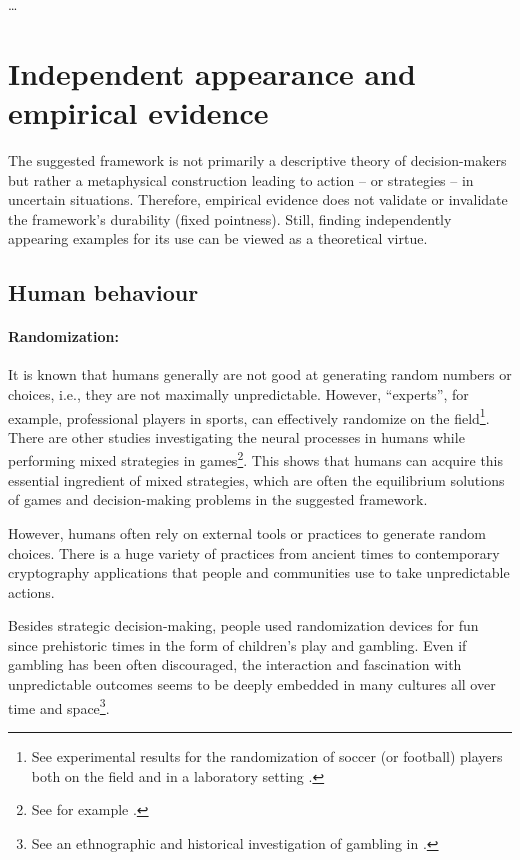\documentclass{article}
\begin{document}
\dots



\section*{Independent appearance and empirical evidence}

The suggested framework is not primarily a descriptive theory of decision-makers but rather a metaphysical construction leading to action -- or strategies -- in uncertain situations.
Therefore, empirical evidence does not validate or invalidate the framework's durability (fixed pointness). Still, finding independently appearing examples for its use can be viewed as a theoretical virtue.

\subsection*{Human behaviour}

\paragraph{Randomization:}
It is known that humans generally are not good at generating random numbers or choices, i.e., they are not maximally unpredictable. However, ``experts'', for example, professional players in sports, can effectively randomize on the field\footnote{See experimental results for the randomization of soccer (or football) players both on the field and in a laboratory setting \cite{paper:MinimaxExperiment01,paper:MinimaxExperiment02,paper:MinimaxExperiment03}.}. There are other studies investigating the neural processes in humans while performing mixed strategies in games\footnote{See for example \cite{paper:PrimateRandomArticle}.}.
This shows that humans can acquire this essential ingredient of mixed strategies, which are often the equilibrium solutions of games and decision-making problems in the suggested framework.

However, humans often rely on external tools or practices to generate random choices. There is a huge variety of practices from ancient times to contemporary cryptography applications that people and communities use to take unpredictable actions.

Besides strategic decision-making, people used randomization devices for fun since prehistoric times in the form of children's play and gambling. Even if gambling has been often discouraged, the interaction and fascination with unpredictable outcomes seems to be deeply embedded in many cultures all over time and space\footnote{See an ethnographic and historical investigation of gambling in \cite{paper:GamblingAcrossCultures}.}.
\end{document}
